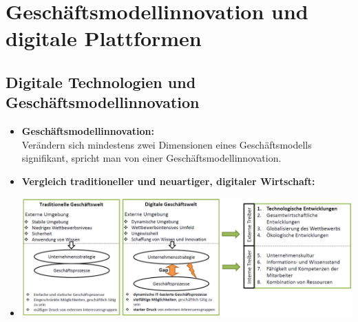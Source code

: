 \documentclass[12pt,a4paper]{article}
\author{Pauline Speckmann}
\begin{document}
\setcounter{section}{6}
\section{Geschäftsmodellinnovation und digitale Plattformen}


\vspace*{1cm}
\subsection{Digitale Technologien und Geschäftsmodellinnovation} %
\begin{itemize}
   \item \textbf{Geschäftsmodellinnovation:}\\
         Verändern sich mindestens zwei Dimensionen eines Geschäftsmodells signifikant, spricht man von einer Geschäftsmodellinnovation.

   \item \textbf{Vergleich traditioneller und neuartiger, digitaler Wirtschaft:}
   \item[] \includegraphics[scale=0.35]{TraditionellVsDigital.png}
   

\end{itemize}
\end{document}
